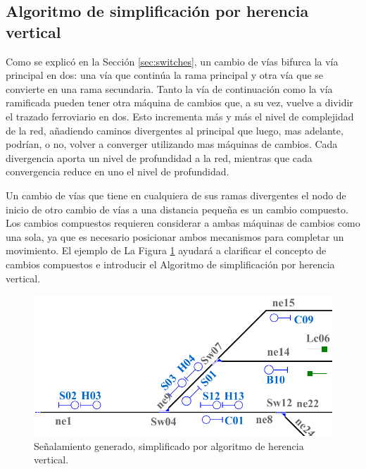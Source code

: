 \subsection{Algoritmo de simplificación por herencia vertical}
	\label{sec:vertical}
	
	Como se explicó en la Sección \ref{sec:switches}, un cambio de vías bifurca la vía principal en dos: una vía que continúa la rama principal y otra vía que se convierte en una rama secundaria. Tanto la vía de continuación como la vía ramificada pueden tener otra máquina de cambios que, a su vez, vuelve a dividir el trazado ferroviario en dos. Esto incrementa más y más el nivel de complejidad de la red, añadiendo caminos divergentes al principal que luego, mas adelante, podrían, o no, volver a converger utilizando mas máquinas de cambios. Cada divergencia aporta un nivel de profundidad a la red, mientras que cada convergencia reduce en uno el nivel de profundidad.
	
	Un cambio de vías que tiene en cualquiera de sus ramas divergentes el nodo de inicio de otro cambio de vías a una distancia pequeña es un cambio compuesto. Los cambios compuestos requieren considerar a ambas máquinas de cambios como una sola, ya que es necesario posicionar ambos mecanismos para completar un movimiento. El ejemplo de La Figura \ref{fig:signal_vertical_1} ayudará a clarificar el concepto de cambios compuestos e introducir el Algoritmo de simplificación por herencia vertical.	

	\begin{figure}[H]
		\centering
		\includegraphics[width=1\textwidth]{Figuras/Figure8_Crop.pdf}
		\centering\caption{Señalamiento generado, simplificado por algoritmo de herencia vertical.}
		\label{fig:signal_vertical_1}
	\end{figure}
	
